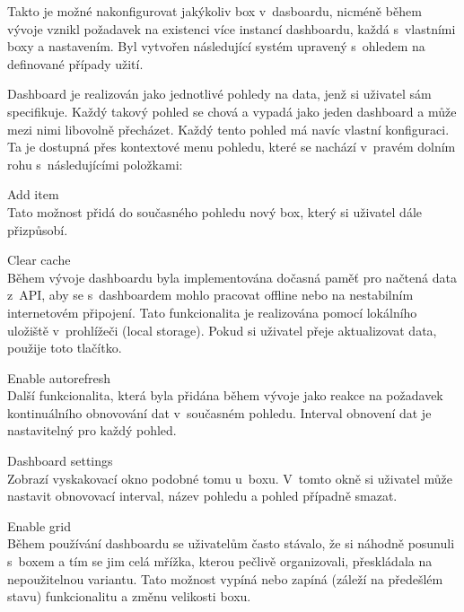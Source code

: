 Takto je možné nakonfigurovat jakýkoliv box v~dasboardu, nicméně během vývoje vznikl požadavek na existenci více instancí dashboardu, každá s~vlastními boxy a nastavením. Byl vytvořen následující systém upravený s~ohledem na definované případy užití.

Dashboard je realizován jako jednotlivé pohledy na data, jenž si uživatel sám specifikuje. Každý takový pohled se chová a vypadá jako jeden dashboard a může mezi nimi libovolně přecházet. Každý tento pohled má navíc vlastní konfiguraci. Ta je dostupná přes kontextové menu pohledu, které se nachází v~pravém dolním rohu s~následujícími položkami:

\begin{description}
    \item Add item \\
        Tato možnost přidá do současného pohledu nový box, který si uživatel dále přizpůsobí.

    \item Clear cache \\
        Během vývoje dashboardu byla implementována dočasná paměť pro načtená data z~API, aby se s~dashboardem mohlo pracovat offline nebo na nestabilním internetovém připojení. Tato funkcionalita je realizována pomocí lokálního uložiště v~prohlížeči (local storage). Pokud si uživatel přeje aktualizovat data, použije toto tlačítko. 

    \item Enable autorefresh \\
        Další funkcionalita, která byla přidána během vývoje jako reakce na požadavek kontinuálního obnovování dat v~současném pohledu. Interval obnovení dat je nastavitelný pro každý pohled.

    \item Dashboard settings \\
        Zobrazí vyskakovací okno podobné tomu u~boxu. V~tomto okně si uživatel může nastavit obnovovací interval, název pohledu a pohled případně smazat.
        
    \item Enable grid\\
        Během používání dashboardu se uživatelům často stávalo, že si náhodně posunuli s~boxem a tím se jim celá mřížka, kterou pečlivě organizovali, přeskládala na nepoužitelnou variantu. Tato možnost vypíná nebo zapíná (záleží na předešlém stavu)  funkcionalitu a změnu velikosti boxu.
\end{description}

